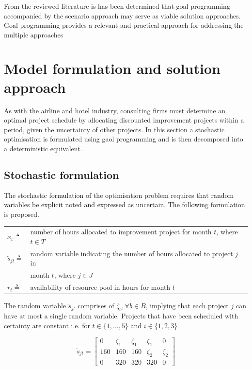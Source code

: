 \documentclass[a4paper,11pt]{article}
\begin{document}
From the reviewed literature is has been determined that goal programming accompanied by the scenario approach may serve as viable solution approaches. Goal programming provides a relevant and practical approach for addressing the multiple approaches


\section{Model formulation and solution approach}
As with the airline and hotel industry, consulting firms must determine an optimal project schedule by allocating discounted improvement projects within a period, given the uncertainty of other projects. In this section a stochastic optimisation is formulated using gaol programming and is then decomposed into a deterministic equivalent. 

\subsection{Stochastic formulation}
The stochastic formulation of the optimisation problem requires that random variables be explicit noted and expressed as uncertain. The following formulation is proposed. 
\vspace{12pt}

\begin{tabular}{ll}
$x_{t}\triangleq$ & number of hours allocated to improvement project for month $t$, where $t \in T$\\
$\tilde{s}_{jt} \triangleq$&  random variable indicating the number of hours allocated to project $j$ in \\
& month $t$, where $j\in J$\\
$r_t \triangleq$ & availability of resource pool in hours for month $t$ \\
\end{tabular}

\vspace{12pt}

The random variable $\tilde{s}_{jt}$ comprises of $\zeta_b, \forall b \in B$, implying that each project $j$ can have at most a single random variable. Projects that have been scheduled with certainty are constant i.e. for $t\in \{1,\dots ,5\}$ and $i\in \{1,2,3\}$

\begin{equation}
	\tilde{s}_{jt} = \begin{bmatrix}
		0 & \zeta_1 & \zeta_1 & \zeta_1 & 0 \\
		160 & 160 & 160 & \zeta_2 & \zeta_2 \\
		0 & 320 & 320 & 320 &0
	\end{bmatrix}
\end{equation}
\end{document}
